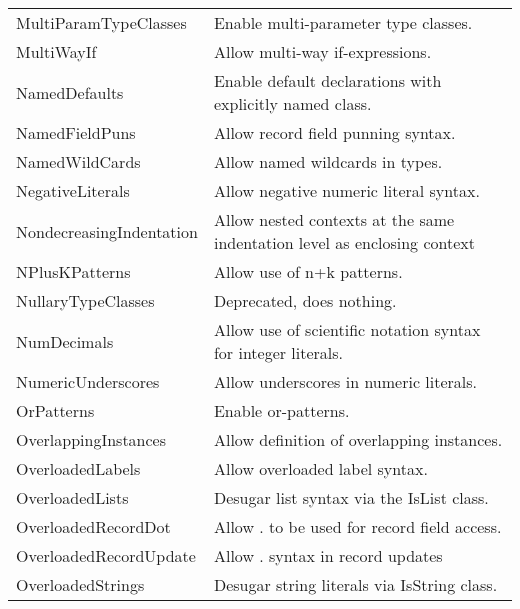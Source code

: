 \documentclass[openany, 12pt]{book}
\begin{document}
\begin{center}
\begin{supertabular}{ll}
		MultiParamTypeClasses      & Enable multi-parameter type classes.                                       \\
		MultiWayIf                 & Allow multi-way if-expressions.                                            \\
		NamedDefaults              & Enable default declarations with explicitly named class.                   \\
		NamedFieldPuns             & Allow record field punning syntax.                                         \\
		NamedWildCards             & Allow named wildcards in types.                                            \\
		NegativeLiterals           & Allow negative numeric literal syntax.                                     \\
		NondecreasingIndentation   & Allow nested contexts at the same indentation level as enclosing context   \\
		NPlusKPatterns             & Allow use of n+k patterns.                                                 \\
		NullaryTypeClasses         & Deprecated, does nothing.                                                  \\
		NumDecimals                & Allow use of scientific notation syntax for integer literals.              \\
		NumericUnderscores         & Allow underscores in numeric literals.                                     \\
		OrPatterns                 & Enable or-patterns.                                                        \\
		OverlappingInstances       & Allow definition of overlapping instances.                                 \\
		OverloadedLabels           & Allow overloaded label syntax.                                             \\
		OverloadedLists            & Desugar list syntax via the IsList class.                                  \\
		OverloadedRecordDot        & Allow . to be used for record field access.                                \\
		OverloadedRecordUpdate     & Allow . syntax in record updates                                           \\
		OverloadedStrings          & Desugar string literals via IsString class.                                \\

\end{supertabular}
\end{center}
\end{document}
